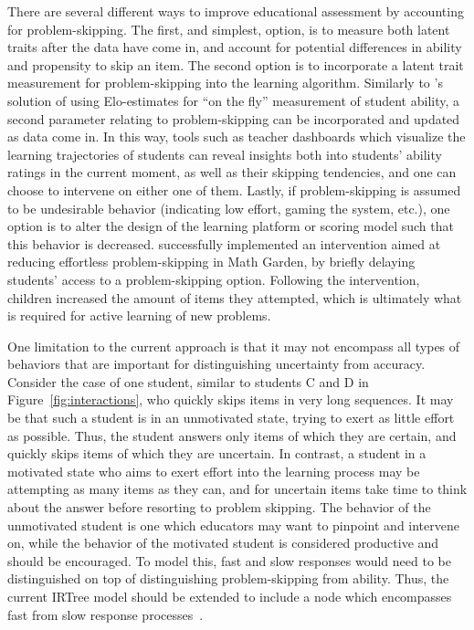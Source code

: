 \documentclass[manuscript]{acmart}
\begin{document}
There are several different ways to improve educational assessment by accounting for problem-skipping. The first, and simplest, option, is to measure both latent traits after the data have come in, and account for potential differences in ability and propensity to skip an item. The second option is to incorporate a latent trait measurement for problem-skipping into the learning algorithm. Similarly to \citet{klinkenberg2011computer}'s solution of using Elo-estimates for ``on the fly'' measurement of student ability, a second parameter relating to problem-skipping can be incorporated and updated as data come in. In this way, tools such as teacher dashboards which visualize the learning trajectories of students can reveal insights both into students' ability ratings in the current moment, as well as their skipping tendencies, and one can choose to intervene on either one of them. Lastly, if problem-skipping is assumed to be undesirable behavior (indicating low effort, gaming the system, etc.), one option is to alter the design of the learning platform or scoring model such that this behavior is decreased. \citet{savi2018delaying} successfully implemented an intervention aimed at reducing effortless problem-skipping in Math Garden, by briefly delaying students' access to a problem-skipping option. Following the intervention, children increased the amount of items they attempted, which is ultimately what is required for active learning of new problems. 

One limitation to the current approach is that it may not encompass all types of behaviors that are important for distinguishing uncertainty from accuracy. Consider the case of one student, similar to students C and D in Figure~\ref{fig:interactions}, who quickly skips items in very long sequences. It may be that such a student is in an unmotivated state, trying to exert as little effort as possible. Thus, the student answers only items of which they are certain, and quickly skips items of which they are uncertain. In contrast, a student in a motivated state who aims to exert effort into the learning process may be attempting as many items as they can, and for uncertain items take time to think about the answer before resorting to problem skipping. The behavior of the unmotivated student is one which educators may want to pinpoint and intervene on, while the behavior of the motivated student is considered productive and should be encouraged. To model this, fast and slow responses would need to be distinguished on top of distinguishing problem-skipping from ability. Thus, the current IRTree model should be extended to include a node which encompasses fast from slow response processes~\cite{coomans2016distinguishing}. 
\end{document}
